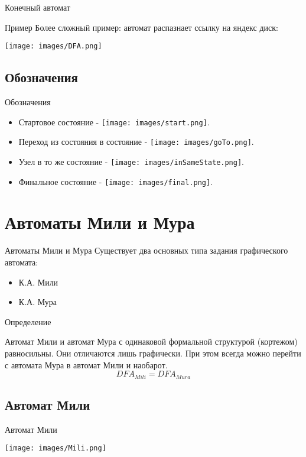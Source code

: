 \documentclass{beamer}
\newenvironment{rusdefinition}[1][Определение]{
    \begin{block}{#1}
}{\end{block}}
\newenvironment{rexample}[1][Пример]{\begin{exampleblock}{#1}}{\end{exampleblock}}
\begin{document}
\begin{frame}{Конечный автомат}
    \begin{rexample}
    Более сложный пример: автомат распазнает ссылку на яндекс диск:
    \begin{center}
        \texttt{[image: images/DFA.png]}
    \end{center}
\end{rexample}
\end{frame}

\subsection{Обозначения}
\begin{frame}{Обозначения}
\begin{itemize}
    \item Стартовое состояние - \texttt{[image: images/start.png]}. 
    \item Переход из состояния в состояние - \texttt{[image: images/goTo.png]}.
    \item Узел в то же состояние - \texttt{[image: images/inSameState.png]}. 
    \item Финальное состояние - \texttt{[image: images/final.png]}.  
\end{itemize}
\end{frame}


\section{Автоматы Мили и Мура}
\begin{frame}{Автоматы Мили и Мура}
    Существует два основных типа задания графического автомата: 
    \begin{itemize}
        \item К.А. Мили
        \item К.А. Мура  
    \end{itemize}
    \begin{rusdefinition}
    Автомат Мили и автомат Мура с одинаковой формальной структурой (кортежом) равносильны.
    Они отличаются лишь графически. При этом всегда можно перейти с автомата Мура в автомат Мили и наобарот. 
    \[ DFA_{Mili} = DFA_{Mura} \]  
\end{rusdefinition}
\end{frame}

\subsection{Автомат Мили}
\begin{frame}{Автомат Мили}
    \begin{center}
        \texttt{[image: images/Mili.png]}
    \end{center}
\end{frame}
\end{document}
